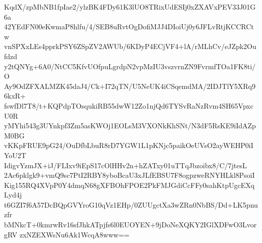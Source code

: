 KqdX/zpMbNB1fpIae2/ylzBK4FDy61K3lUO8TRixUdESIj0xZXAVxPEV33J01G6a
42YEdFN00eKwmaP8hlfu/4/SEB8uRvtOgDofiMJJ4DIoiUj0y6JFLvRtjKCCRCtw
vnSPXxLEs4pprkPSY6ZSpZV2AWUb/6KDyP4ECjVF4+lA/rMLhCv/eJZpk2Oufdzd
y2tQNYg+6A0/NtCC5KfvUOfpuLgrdpN2vpMzIU3vszvrnZN9FvrmfTOa1FK8ti/O
Ay9OdZFXALMZK45daJ4/Ck+I72qTN/U5NeUK4iCSqemdMA/2IDJTlY5XRq96kxR+
fswfDl7T8/t+KQPdpTOsqukiRB55dwW12Zo1njQd6TYSvRaNzRvm4SH65VpxcU0R
yMYhi543g3UYnkpf3Zm5asKWOj1EOLsM3VXONkKhSNt/N3dF5RsKE9iIdAZpM0BG
vKKpFRUE9pG24/OuDfbLbuR8rD7YGW1L1pKNjc5paikOeUVsO2ayWEHP0iIYoU2T
IdigvYzmJX+iJ/FLIxv9iEpS17cOlHHv2n+hZATxy01uTTqJbzoibx8/C/7jtesL
2Ac6pklgk9+vmQ9sc7PtI2RBY8yboBcaU3xJLfEBSU7F8ogpzweRNYHLkl8PsoiI
Kig155RQ4XVpP0Y4dmqN68gXFBOhFPOE2PkFMJGdiCcFFy0sahKtpUgcEXqLyd4j
t6GZI7f6A57DcBQpGVYroG10qVz1EHp/0ZUUgctXa3wZRn0NbBS/Dd+LK5pnuzfr
bMNkcT+0kmrwRv16sfJhkATpjfs6l0EUOYEN+9jDoNeXQKY2IGlXDFwO3LvorgRV
zxNZEXWsNu6Ak1WcqA8www==
